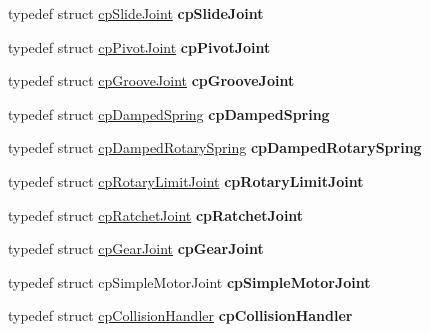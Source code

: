 \begin{DoxyCompactItemize}
typedef struct \hyperlink{structcpSlideJoint}{cp\+Slide\+Joint} {\bfseries cp\+Slide\+Joint}
\item 
\mbox{\label{group__misc_ga6be42317226c36d7c3b71175c31bed55}} 
typedef struct \hyperlink{structcpPivotJoint}{cp\+Pivot\+Joint} {\bfseries cp\+Pivot\+Joint}
\item 
\mbox{\label{group__misc_ga4aa4733fb7b33f6650ce92a7d2bf9361}} 
typedef struct \hyperlink{structcpGrooveJoint}{cp\+Groove\+Joint} {\bfseries cp\+Groove\+Joint}
\item 
\mbox{\label{group__misc_gab4c3629bf0daa6e27aaff6ac1bdc0fb7}} 
typedef struct \hyperlink{structcpDampedSpring}{cp\+Damped\+Spring} {\bfseries cp\+Damped\+Spring}
\item 
\mbox{\label{group__misc_ga48602f8d634857dac76e75f05458aea1}} 
typedef struct \hyperlink{structcpDampedRotarySpring}{cp\+Damped\+Rotary\+Spring} {\bfseries cp\+Damped\+Rotary\+Spring}
\item 
\mbox{\label{group__misc_ga54615af04b79ce2b9f2dfedc8e702da3}} 
typedef struct \hyperlink{structcpRotaryLimitJoint}{cp\+Rotary\+Limit\+Joint} {\bfseries cp\+Rotary\+Limit\+Joint}
\item 
\mbox{\label{group__misc_ga574d87330384b10b88666948ea424a50}} 
typedef struct \hyperlink{structcpRatchetJoint}{cp\+Ratchet\+Joint} {\bfseries cp\+Ratchet\+Joint}
\item 
\mbox{\label{group__misc_gac590a81b11f1ee5ae26108e24a5b6074}} 
typedef struct \hyperlink{structcpGearJoint}{cp\+Gear\+Joint} {\bfseries cp\+Gear\+Joint}
\item 
\mbox{\label{group__misc_ga946a6726ce9067b29e944ff0f9309120}} 
typedef struct cp\+Simple\+Motor\+Joint {\bfseries cp\+Simple\+Motor\+Joint}
\item 
\mbox{\label{group__misc_gad27db8fe21c73da2f139b0f28ded9818}} 
typedef struct \hyperlink{structcpCollisionHandler}{cp\+Collision\+Handler} {\bfseries cp\+Collision\+Handler}
\item 
\mbox{\label{group__misc_ga878866fdedeef4e18219aef96b040cfa}} 

\end{DoxyCompactItemize}
